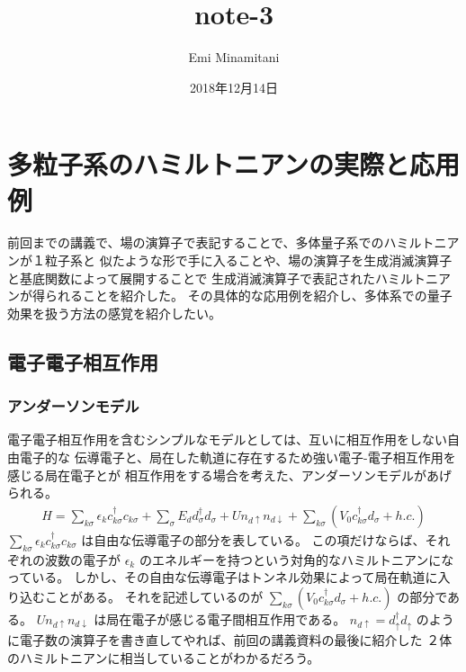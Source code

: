 \documentclass[letterpaper,10pt,dvipdfmx]{sphinxhowto}
\title{note-3}
\date{2018年12月14日}
\author{Emi Minamitani}
\begin{document}
\pagestyle{empty}
\maketitle
\pagestyle{plain}
\sphinxtableofcontents
\pagestyle{normal}
\label{\detokenize{index::doc}}



\chapter{多粒子系のハミルトニアンの実際と応用例}
\label{\detokenize{index:id2}}
前回までの講義で、場の演算子で表記することで、多体量子系でのハミルトニアンが１粒子系と
似たような形で手に入ることや、場の演算子を生成消滅演算子と基底関数によって展開することで
生成消滅演算子で表記されたハミルトニアンが得られることを紹介した。
その具体的な応用例を紹介し、多体系での量子効果を扱う方法の感覚を紹介したい。


\section{電子電子相互作用}
\label{\detokenize{index:id3}}

\subsection{アンダーソンモデル}
\label{\detokenize{index:id4}}
電子電子相互作用を含むシンプルなモデルとしては、互いに相互作用をしない自由電子的な
伝導電子と、局在した軌道に存在するため強い電子-電子相互作用を感じる局在電子とが
相互作用をする場合を考えた、アンダーソンモデルがあげられる。
\begin{equation*}
\begin{split}H=\sum_{k\sigma} \epsilon_k c_{k\sigma}^\dagger c_{k\sigma}+\sum_{\sigma}E_d d_{\sigma}^\dagger
d_{\sigma} +Un_{d\uparrow}n_{d\downarrow} +\sum_{k\sigma}(V_{0}
c_{k\sigma}^\dagger d_{\sigma} + h.c.)\end{split}
\end{equation*}
\(\sum_{k\sigma} \epsilon_k c_{k\sigma}^\dagger c_{k\sigma}\)
は自由な伝導電子の部分を表している。
この項だけならば、それぞれの波数の電子が
\(\epsilon_k\)
のエネルギーを持つという対角的なハミルトニアンになっている。
しかし、その自由な伝導電子はトンネル効果によって局在軌道に入り込むことがある。
それを記述しているのが
\(\sum_{k\sigma}(V_{0} c_{k\sigma}^\dagger d_{\sigma} + h.c.)\)
の部分である。
\(Un_{d\uparrow}n_{d\downarrow}\)
は局在電子が感じる電子間相互作用である。
\(n_{d\uparrow}=d^\dagger_\uparrow d_\uparrow\)
のように電子数の演算子を書き直してやれば、前回の講義資料の最後に紹介した
２体のハミルトニアンに相当していることがわかるだろう。
\end{document}
